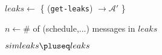 
\begin{bbox}[title={Algorithm $\msf{SimGetLeaks}$}]
	
	\begin{renumerate}
		\item $leaks \leftarrow$ \{ \Send (\texttt{get-leaks}) $\rightarrow \mathcal{\mathcal{A}'}$ \}
		\item $n \leftarrow \#$ of (schedule,...) messages in $leaks$
		\item $simleaks \pluseq leaks$
	\end{renumerate}

\end{bbox}

